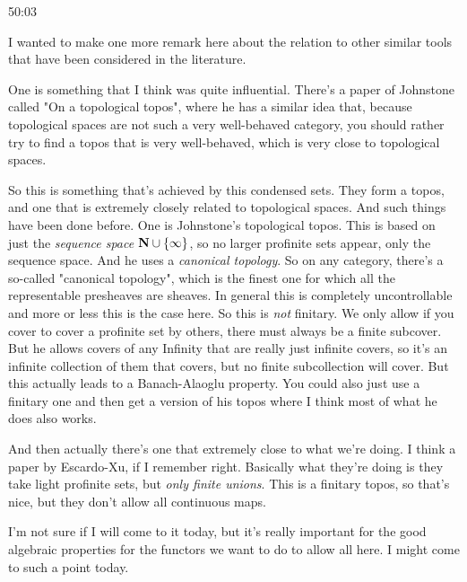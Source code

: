 \begin{example}
\begin{unfinished}{50:03}
\begin{remark}
I wanted to make one more remark here about the relation to other similar tools that have been considered in the literature.

One is something that I think was quite influential. There's a paper of Johnstone called "On a topological topos", \citeme{} where he has a similar idea that, because topological spaces are not such a very well-behaved category, you should rather try to find a topos that is very well-behaved, which is very close to topological spaces.


So this is something that's achieved by this condensed sets. They form a topos, and one that is extremely closely related to topological spaces. And such things have been done before. One is Johnstone's topological topos. This is based on just the \emph{sequence space} $\mathbf N \cup \{\infty\}$, so no larger profinite sets appear, only the sequence space.
And he uses a \emph{canonical topology}. So on any category, there's a so-called "canonical topology", which is the finest one for which all the representable presheaves are sheaves. %
In general this is completely uncontrollable and more or less this is the case here. So this is \emph{not} finitary. We only allow if you cover to cover a  profinite set by others, there must always be a finite subcover. But he allows covers of any 
Infinity that are really just infinite covers, so it's an infinite collection of them that covers, but no finite subcollection will cover. But this actually leads to a Banach-Alaoglu property.
You could also just use a finitary one and then get a version of his topos where I think most of what he does also works. 

And then actually there's one that extremely close to what we're doing. I think a paper by Escardo-Xu, if I remember right. Basically what they're doing is they take light profinite sets, but \emph{only finite unions}. This is a finitary topos, so that's nice, but they don't allow all continuous maps.

I'm not sure if I will come to it today, but it's really important for the good algebraic properties for the functors we want to do to allow all here. I might come to such a point today.


\end{remark}
\end{unfinished}
\end{example}
